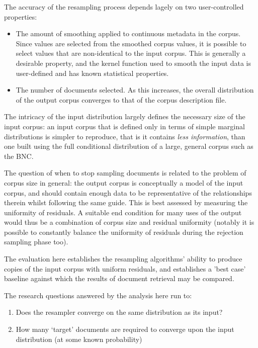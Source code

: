 
The accuracy of the resampling process depends lagely on two user-controlled properties:

\begin{itemize}
    \item The amount of smoothing applied to continuous metadata in the corpus.  Since values are selected from the smoothed corpus values, it is possible to select values that are non-identical to the input corpus.  This is generally a desirable property, and the kernel function used to smooth the input data is user-defined and has known statistical properties.
    \item The number of documents selected.  As this increases, the overall distribution of the output corpus converges to that of the corpus description file.
\end{itemize}


The intricacy of the input distribution largely defines the necessary size of the input corpus: an input corpus that is defined only in terms of simple marginal distributions is simpler to reproduce, that is it contains \textit{less information}, than one built using the full conditional distribution of a large, general corpus such as the BNC.

The question of when to stop sampling documents is related to the problem of corpus size in general: the output corpus is conceptually a model of the input corpus, and should contain enough data to be representative of the relationships therein whilst following the same guide.  This is best assessed by measuring the uniformity of residuals.  A suitable end condition for many uses of the output would thus be a combination of corpus size and residual uniformity (notably it is possible to constantly balance the uniformity of residuals during the rejection sampling phase too).

The evaluation here establishes the resampling algorithms' ability to produce copies of the input corpus with uniform residuals, and establishes a 'best case' baseline against which the results of document retrieval may be compared.

The research questions answered by the analysis here run to:

\begin{enumerate}
    \item Does the resampler converge on the same distribution as its input?
    \item How many `target' documents are required to converge upon the input distribution (at some known probability)
\end{enumerate}


